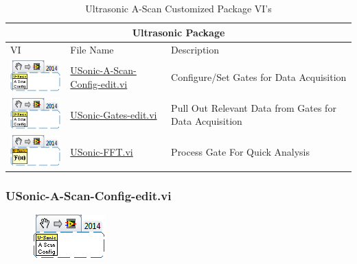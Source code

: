 \documentclass[11pt,a4paper,oldfontcommands]{memoir}
\begin{document}
\begin{table}[H]
	\centering
	\begin{tabular}{ m{2.5cm} | m{5cm} | m{5cm} }
		\hline
		\hline \multicolumn{3}{c}{Ultrasonic Package} \\ \hline \hline
		VI & File Name & Description \\ \hline
		\includegraphics[scale=0.625]{USonic-A-Scan-Config-edit_main_01} & \hyperref[USonic-Config]{USonic-A-Scan-Config-edit.vi} & Configure/Set Gates for Data Acquisition \\ \hline
		\includegraphics[scale=0.625]{USonic-A-Scan-Config-edit_main_01} & \hyperref[USonic-Gates]{USonic-Gates-edit.vi} & Pull Out Relevant Data from Gates for Data Acquisition \\ \hline
		\includegraphics[scale=0.625]{USonic-FFT_main_01} & \hyperref[USonic-FFT]{USonic-FFT.vi} & Process Gate For Quick Analysis \\ \hline
	\end{tabular}
	\caption{Ultrasonic A-Scan Customized Package VI's}
	\label{tab:usonic}
\end{table}

\subsubsection{USonic-A-Scan-Config-edit.vi} \label{USonic-Config}
\noindent\hrulefill

\begin{figure}[h]
	\includegraphics[scale=0.625]{USonic-A-Scan-Config-edit_main_01}
	\label{fig:USonic-A-Scan-Config-edit_main_01}
\end{figure}
\end{document}
